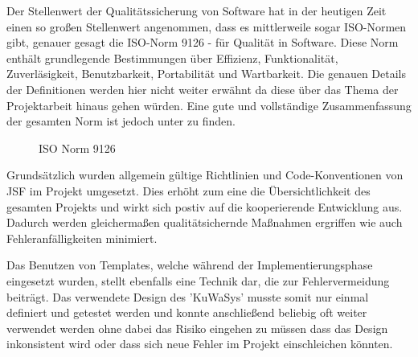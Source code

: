 \documentclass[12pt, twoside, a4paper, ngerman]{article}
\begin{document}
Der Stellenwert der Qualitätssicherung von Software hat in der heutigen Zeit einen so großen Stellenwert angenommen, dass es mittlerweile sogar ISO-Normen gibt, genauer gesagt die ISO-Norm 9126 - für Qualität in Software. Diese Norm enthält grundlegende Bestimmungen über Effizienz, Funktionalität, Zuverläsigkeit, Benutzbarkeit, Portabilität und Wartbarkeit. 
Die genauen Details der Definitionen werden hier nicht weiter erwähnt da diese über das Thema der Projektarbeit hinaus gehen würden. Eine gute und vollständige Zusammenfassung der gesamten Norm ist jedoch unter \cite{WikiISO9126} zu finden.

\begin{figure}[H]
\centering{}
\caption[\textbf{ISO Norm 9126}]{ISO Norm 9126}
\label{fig:Projekt_Mindmap}
\end{figure}

Grundsätzlich wurden allgemein gültige Richtlinien und Code-Konventionen von JSF im Projekt umgesetzt. Dies erhöht zum eine die Übersichtlichkeit des gesamten Projekts und wirkt sich postiv auf die kooperierende Entwicklung aus. Dadurch werden gleichermaßen qualitätsichernde Maßnahmen ergriffen wie auch Fehleranfälligkeiten minimiert.  

Das Benutzen von Templates, welche während der Implementierungsphase eingesetzt wurden, stellt ebenfalls eine Technik dar, die zur Fehlervermeidung beiträgt. Das verwendete Design des 'KuWaSys' musste somit nur einmal definiert und getestet werden und konnte anschließend beliebig oft weiter verwendet werden ohne dabei das Risiko eingehen zu müssen dass das Design inkonsistent wird oder dass sich neue Fehler im Projekt einschleichen könnten. 
\end{document}
